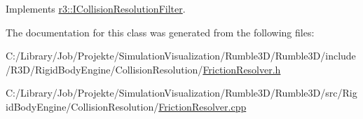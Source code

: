 Implements \mbox{\hyperlink{classr3_1_1_i_collision_resolution_filter_a87ef2579e2acaaadef4cd8f9a20005ce}{r3\+::\+I\+Collision\+Resolution\+Filter}}.



The documentation for this class was generated from the following files\+:\begin{DoxyCompactItemize}
\item 
C\+:/\+Library/\+Job/\+Projekte/\+Simulation\+Visualization/\+Rumble3\+D/\+Rumble3\+D/include/\+R3\+D/\+Rigid\+Body\+Engine/\+Collision\+Resolution/\mbox{\hyperlink{_friction_resolver_8h}{Friction\+Resolver.\+h}}\item 
C\+:/\+Library/\+Job/\+Projekte/\+Simulation\+Visualization/\+Rumble3\+D/\+Rumble3\+D/src/\+Rigid\+Body\+Engine/\+Collision\+Resolution/\mbox{\hyperlink{_friction_resolver_8cpp}{Friction\+Resolver.\+cpp}}\end{DoxyCompactItemize}
